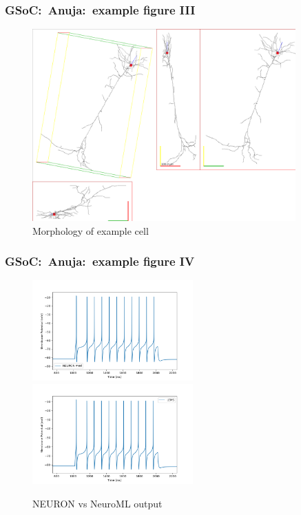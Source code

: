 \begin{frame}[c]
  \frametitle{GSoC:\ Anuja:\ example figure III}
  \begin{figure}[h]
    \centering
    \includegraphics[width=0.9\textwidth]{99_images/Cell_497232312.cell}
    \caption{Morphology of example cell}%
    \label{fig:99_images-morph}
  \end{figure}
\end{frame}
\begin{frame}[c]
  \frametitle{GSoC:\ Anuja:\ example figure IV}
  \begin{figure}[h]
    \centering
    \includegraphics[width=0.55\textwidth]{99_images/NEURON_497232312}\\
    \includegraphics[width=0.55\textwidth]{99_images/LEMS_497232312}
    \caption{NEURON vs NeuroML output}%
    \label{fig:99_images-anuja-neuron-neuroml}
  \end{figure}
\end{frame}
